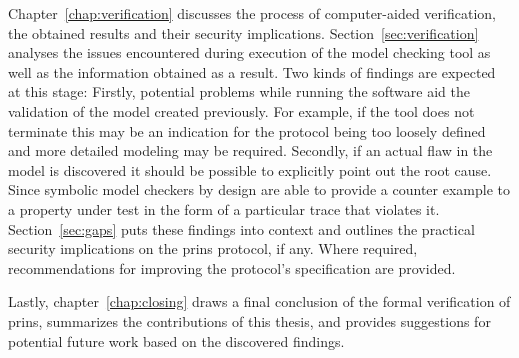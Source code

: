 Chapter~\ref{chap:verification} discusses the process of computer-aided verification, the obtained results and their security implications.
Section~\ref{sec:verification} analyses the issues encountered during execution of the model checking tool as well as the information obtained as a result.
Two kinds of findings are expected at this stage:
Firstly, potential problems while running the software aid the validation of the model created previously.
For example, if the tool does not terminate this may be an indication for the protocol being too loosely defined and more detailed modeling may be required.
Secondly, if an actual flaw in the model is discovered it should be possible to explicitly point out the root cause.
Since symbolic model checkers by design are able to provide a counter example to a property under test in the form of a particular trace that violates it.
Section~\ref{sec:gaps} puts these findings into context and outlines the practical security implications on the \gls{prins} protocol, if any.
Where required, recommendations for improving the protocol's specification are provided.

Lastly, chapter~\ref{chap:closing} draws a final conclusion of the formal verification of \gls{prins}, summarizes the contributions of this thesis, and provides suggestions for potential future work based on the discovered findings.
